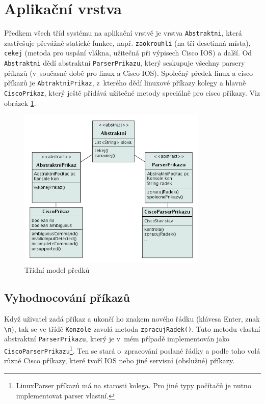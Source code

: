
\section{Aplikační vrstva}
Předkem všech tříd systému na aplikační vrstvě je vrstva \verb|Abstraktni|, která zastřešuje převážně statické funkce, např. \verb|zaokrouhli| (na tři desetinná místa), \verb|cekej| (metoda pro uspání vlákna, užitečná při výpisech Cisco IOS) a další. Od \verb|Abstraktni| dědí abstraktní \verb|ParserPrikazu|, který seskupuje všechny parsery příkazů (v~současné době pro linux a Cisco IOS). Společný předek linux a cisco příkazů je \verb|AbtraktniPrikaz|, z~kterého dědí linuxové příkazy kolegy a hlavně \verb|CiscoPrikaz|, který ještě přidává užitečné metody speciálně pro cisco příkazy. Viz obrázek \ref{uml:abstraktni}.

\begin{figure}[h]
\begin{center}
\includegraphics[width=9cm]{figures/uml_abtraktni.png}
\caption{Třídní model předků}
\label{uml:abstraktni}
\end{center}
\end{figure}

\subsection{Vyhodnocování příkazů}
Když uživatel zadá příkaz a ukončí ho znakem nového řádku (klávesa Enter, znak \verb|\n|), tak se ve třídě \verb|Konzole| zavolá metoda \verb|zpracujRadek()|. Tuto metodu vlastní abstraktní \verb|ParserPrikazu|, který je v~mém případě implementován jako \verb|CiscoParserPrikazu|\footnote{LinuxParser příkazů má na starosti kolega. Pro jiné typy počítačů je nutno implementovat parser vlastní.}. Ten se stará o~zpracování poslané řádky a podle toho volá různé Cisco příkazy, které tvoří IOS nebo jiné servisní (obslužné) příkazy.

